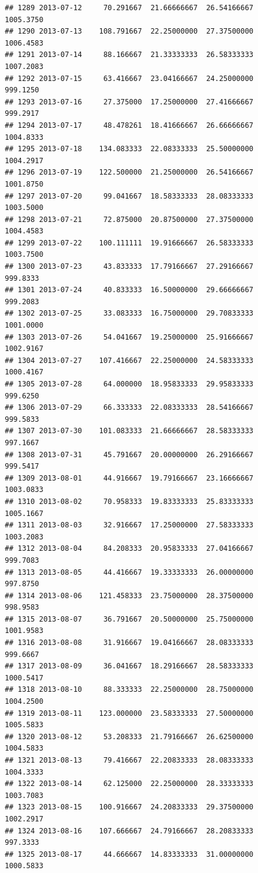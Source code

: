 \documentclass[
]{article}
\begin{document}
\begin{verbatim}
## 1289 2013-07-12     70.291667  21.66666667  26.54166667    1005.3750
## 1290 2013-07-13    108.791667  22.25000000  27.37500000    1006.4583
## 1291 2013-07-14     88.166667  21.33333333  26.58333333    1007.2083
## 1292 2013-07-15     63.416667  23.04166667  24.25000000     999.1250
## 1293 2013-07-16     27.375000  17.25000000  27.41666667     999.2917
## 1294 2013-07-17     48.478261  18.41666667  26.66666667    1004.8333
## 1295 2013-07-18    134.083333  22.08333333  25.50000000    1004.2917
## 1296 2013-07-19    122.500000  21.25000000  26.54166667    1001.8750
## 1297 2013-07-20     99.041667  18.58333333  28.08333333    1003.5000
## 1298 2013-07-21     72.875000  20.87500000  27.37500000    1004.4583
## 1299 2013-07-22    100.111111  19.91666667  26.58333333    1003.7500
## 1300 2013-07-23     43.833333  17.79166667  27.29166667     999.8333
## 1301 2013-07-24     40.833333  16.50000000  29.66666667     999.2083
## 1302 2013-07-25     33.083333  16.75000000  29.70833333    1001.0000
## 1303 2013-07-26     54.041667  19.25000000  25.91666667    1002.9167
## 1304 2013-07-27    107.416667  22.25000000  24.58333333    1000.4167
## 1305 2013-07-28     64.000000  18.95833333  29.95833333     999.6250
## 1306 2013-07-29     66.333333  22.08333333  28.54166667     999.5833
## 1307 2013-07-30    101.083333  21.66666667  28.58333333     997.1667
## 1308 2013-07-31     45.791667  20.00000000  26.29166667     999.5417
## 1309 2013-08-01     44.916667  19.79166667  23.16666667    1003.0833
## 1310 2013-08-02     70.958333  19.83333333  25.83333333    1005.1667
## 1311 2013-08-03     32.916667  17.25000000  27.58333333    1003.2083
## 1312 2013-08-04     84.208333  20.95833333  27.04166667     999.7083
## 1313 2013-08-05     44.416667  19.33333333  26.00000000     997.8750
## 1314 2013-08-06    121.458333  23.75000000  28.37500000     998.9583
## 1315 2013-08-07     36.791667  20.50000000  25.75000000    1001.9583
## 1316 2013-08-08     31.916667  19.04166667  28.08333333     999.6667
## 1317 2013-08-09     36.041667  18.29166667  28.58333333    1000.5417
## 1318 2013-08-10     88.333333  22.25000000  28.75000000    1004.2500
## 1319 2013-08-11    123.000000  23.58333333  27.50000000    1005.5833
## 1320 2013-08-12     53.208333  21.79166667  26.62500000    1004.5833
## 1321 2013-08-13     79.416667  22.20833333  28.08333333    1004.3333
## 1322 2013-08-14     62.125000  22.25000000  28.33333333    1003.7083
## 1323 2013-08-15    100.916667  24.20833333  29.37500000    1002.2917
## 1324 2013-08-16    107.666667  24.79166667  28.20833333     997.3333
## 1325 2013-08-17     44.666667  14.83333333  31.00000000    1000.5833

\end{verbatim}
\end{document}
